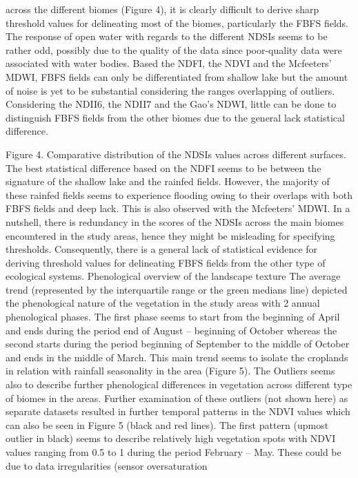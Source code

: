 \documentclass[12pt,oneside]{article}
\begin{document}
across the different biomes (Figure 4), it is clearly difficult to
derive sharp threshold values for delineating most of the biomes,
particularly the FBFS fields. The response of open water with regards to
the different NDSIs seems to be rather odd, possibly due to the quality
of the data since poor-quality data were associated with water bodies.
Based the NDFI, the NDVI and the Mcfeeters' MDWI, FBFS fields can only
be differentiated from shallow lake but the amount of noise is yet to be
substantial considering the ranges overlapping of outliers. Considering
the NDII6, the NDII7 and the Gao's NDWI, little can be done to
distinguish FBFS fields from the other biomes due to the general lack
statistical difference.

Figure 4. Comparative distribution of the NDSIs values across different
surfaces. The best statistical difference based on the NDFI seems to be
between the signature of the shallow lake and the rainfed fields.
However, the majority of these rainfed fields seems to experience
flooding owing to their overlaps with both FBFS fields and deep lack.
This is also observed with the Mcfeeters' MDWI. In a nutshell, there is
redundancy in the scores of the NDSIs across the main biomes encountered
in the study areas, hence they might be misleading for specifying
thresholds. Consequently, there is a general lack of statistical
evidence for deriving threshold values for delineating FBFS fields from
the other type of ecological systems. Phenological overview of the
landscape texture The average trend (represented by the interquartile
range or the green medians line) depicted the phenological nature of the
vegetation in the study areas with 2 annual phenological phases. The
first phase seems to start from the beginning of April and ends during
the period end of August -- beginning of October whereas the second
starts during the period beginning of September to the middle of October
and ends in the middle of March. This main trend seems to isolate the
croplands in relation with rainfall seasonality in the area (Figure 5).
The Outliers seems also to describe further phenological differences in
vegetation across different type of biomes in the areas. Further
examination of these outliers (not shown here) as separate datasets
resulted in further temporal patterns in the NDVI values which can also
be seen in Figure 5 (black and red lines). The first pattern (upmost
outlier in black) seems to describe relatively high vegetation spots
with NDVI values ranging from 0.5 to 1 during the period February --
May. These could be due to data irregularities (sensor oversaturation
\end{document}
